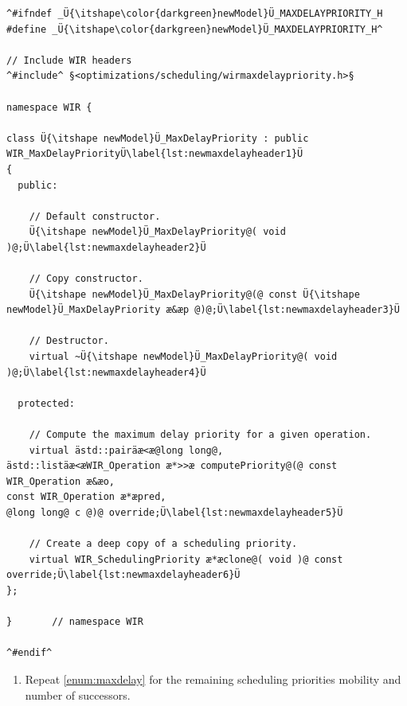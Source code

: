 \begin{lstlisting}[style=code,float=t,caption={Header File for a New Processor Model's Maximum Delay Scheduling Priority},label=lst:newmaxdelayheader]
^#ifndef _Ü{\itshape\color{darkgreen}newModel}Ü_MAXDELAYPRIORITY_H
#define _Ü{\itshape\color{darkgreen}newModel}Ü_MAXDELAYPRIORITY_H^

// Include WIR headers
^#include^ §<optimizations/scheduling/wirmaxdelaypriority.h>§

namespace WIR {

class Ü{\itshape newModel}Ü_MaxDelayPriority : public WIR_MaxDelayPriorityÜ\label{lst:newmaxdelayheader1}Ü
{
  public:

    // Default constructor.
    Ü{\itshape newModel}Ü_MaxDelayPriority@( void )@;Ü\label{lst:newmaxdelayheader2}Ü

    // Copy constructor.
    Ü{\itshape newModel}Ü_MaxDelayPriority@(@ const Ü{\itshape newModel}Ü_MaxDelayPriority æ&æp @)@;Ü\label{lst:newmaxdelayheader3}Ü

    // Destructor.
    virtual ~Ü{\itshape newModel}Ü_MaxDelayPriority@( void )@;Ü\label{lst:newmaxdelayheader4}Ü

  protected:

    // Compute the maximum delay priority for a given operation.
    virtual ästd::pairäæ<æ@long long@,                                                                                                ästd::listäæ<æWIR_Operation æ*>>æ computePriority@(@ const WIR_Operation æ&æo,                                                                                   const WIR_Operation æ*æpred,                                                                                @long long@ c @)@ override;Ü\label{lst:newmaxdelayheader5}Ü

    // Create a deep copy of a scheduling priority.
    virtual WIR_SchedulingPriority æ*æclone@( void )@ const override;Ü\label{lst:newmaxdelayheader6}Ü
};

}       // namespace WIR

^#endif^
\end{lstlisting}

\begin{enumerate}[resume]
    \item Repeat \cref{enum:maxdelay} for the remaining scheduling priorities mobility and number of successors.
\end{enumerate}

\cleardoubleoddpage
